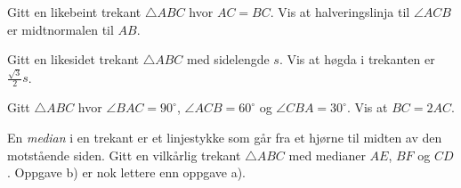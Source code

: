 



	
\opgt

Gitt en likebeint trekant $\triangle {ABC} $ hvor $ AC=BC $. Vis at halveringslinja til $ \angle ACB $ er midtnormalen til $ AB $.

Gitt en likesidet trekant $ \triangle ABC $ med sidelengde $ s $. Vis at høgda i trekanten er $ \frac{\sqrt{3}}{2}s $.

Gitt $ \triangle ABC $ hvor $ \angle BAC=90^\circ $, $ \angle ACB=60^\circ $ og $ \angle CBA=30^\circ $. Vis at $ BC=2AC $.

En \textit{median} i en trekant er et linjestykke som går fra et hjørne til midten av den motstående siden. 
Gitt en vilkårlig trekant $ \triangle ABC $ med medianer $ AE $, $ BF $ og  $ CD $. 
\mer Oppgave b) er nok lettere enn oppgave a).



